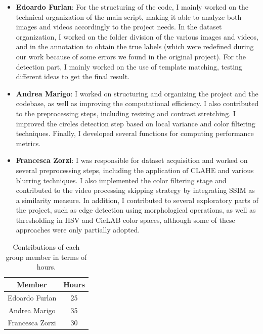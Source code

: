 \begin{itemize}
    \item \textbf{Edoardo Furlan}: For the structuring of the code, I mainly worked on the technical organization of the main script, making it able to analyze both images and videos accordingly to the project needs. In the dataset organization, I worked on the folder division of the various images and videos, and in the annotation to obtain the true labels (which were redefined during our work because of some errors we found in the original project). For the detection part, I mainly worked on the use of template matching, testing different ideas to get the final result.
    \item \textbf{Andrea Marigo}: I worked on structuring and organizing the project and the codebase, as well as improving the computational efficiency. I also contributed to the preprocessing steps, including resizing and contrast stretching. I improved the circles detection step based on local variance and color filtering techniques. Finally, I developed several functions for computing performance metrics.
    \item \textbf{Francesca Zorzi}: I was responsible for dataset acquisition and worked on several preprocessing steps, including the application of CLAHE and various blurring techniques. I also implemented the color filtering stage and contributed to the video processing skipping strategy by integrating SSIM as a similarity measure. In addition, I contributed to several exploratory parts of the project, such as edge detection using morphological operations, as well as thresholding in HSV and CieLAB color spaces, although some of these approaches were only partially adopted.
\end{itemize}

\begin{table}[h!]
    \centering
    \begin{tabular}{c|c}
        \hline
        \textbf{Member} & \textbf{Hours} \\
        \hline
        Edoardo Furlan & 25  \\
        Andrea Marigo & 35 \\
        Francesca Zorzi & 30 \\
        \hline
    \end{tabular}
    \caption{Contributions of each group member in terms of hours.}
    \label{tab:contributions}
\end{table}